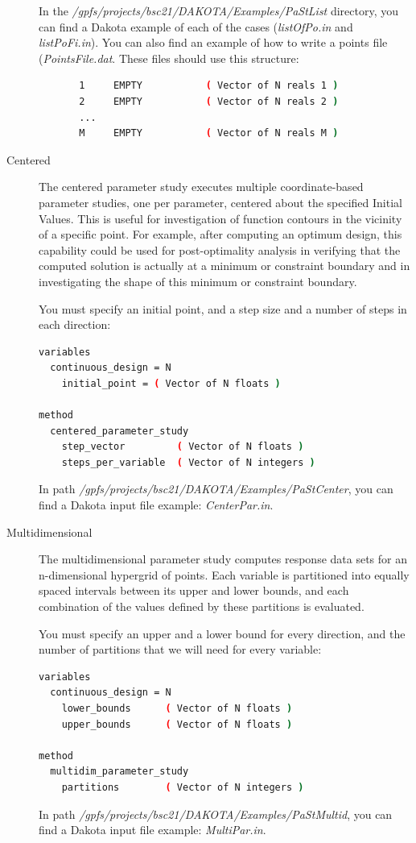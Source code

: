 \documentclass[12pt,a4paper,article]{memoir}
\begin{document}
\begin{description}
In the \textit{/gpfs/projects/bsc21/DAKOTA/Examples/PaStList} directory, you can find a Dakota example of each of the cases (\textit{listOfPo.in} and \textit{listPoFi.in}). You can also find an example of how to write a points file (\textit{PointsFile.dat}. These files should use this structure:

\begin{lstlisting}[style=MyCodeStyle,language=bash]
% Comment line / Description of the columns
       1     EMPTY           ( Vector of N reals 1 )
       2     EMPTY           ( Vector of N reals 2 )
       ...
       M     EMPTY           ( Vector of N reals M )
\end{lstlisting}

\item[Centered] The centered parameter study executes multiple coordinate-based parameter studies, one per parameter, centered about the specified Initial Values. This is useful for investigation of function contours in the vicinity of a specific point. For example, after computing an optimum design, this capability could be used for post-optimality analysis in verifying that the computed solution is actually at a minimum or constraint boundary and in investigating the shape of this minimum or constraint boundary.

You must specify an initial point, and a step size and a number of steps in each direction:

\begin{lstlisting}[style=MyCodeStyle,language=bash]
variables
  continuous_design = N
    initial_point = ( Vector of N floats )

method
  centered_parameter_study
    step_vector         ( Vector of N floats )
    steps_per_variable  ( Vector of N integers )
\end{lstlisting}

In path \textit{/gpfs/projects/bsc21/DAKOTA/Examples/PaStCenter}, you can find a Dakota input file example: \textit{CenterPar.in}.

\item[Multidimensional] The multidimensional parameter study computes response data sets for an n-dimensional hypergrid of points. Each variable is partitioned into equally spaced intervals between its upper and lower bounds, and each combination of the values defined by these partitions is evaluated.

You must specify an upper and a lower bound for every direction, and the number of partitions that we will need for every variable:

\begin{lstlisting}[style=MyCodeStyle,language=bash]
variables
  continuous_design = N
    lower_bounds      ( Vector of N floats )
    upper_bounds      ( Vector of N floats )

method
  multidim_parameter_study
    partitions        ( Vector of N integers )
\end{lstlisting}

In path \textit{/gpfs/projects/bsc21/DAKOTA/Examples/PaStMultid}, you can find a Dakota input file example: \textit{MultiPar.in}.
\end{description}
\end{document}
